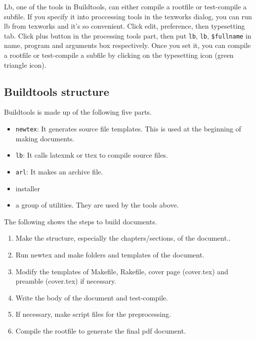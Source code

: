 Lb, one of the tools in Buildtools, can either compile a rootfile or
test-compile a subfile. If you specify it into proccessing tools in the
texworks dialog, you can run lb from texworks and it's so convenient.
Click edit, preference, then typesetting tab. Click plus button in the
processing tools part, then put \texttt{lb}, \texttt{lb},
\texttt{\$fullname} in name, program and arguments box respectively.
Once you set it, you can compile a rootfile or test-compile a subfile by
clicking on the typesetting icon (green triangle icon).

\hypertarget{buildtools-structure}{%
\subsection{Buildtools structure}\label{buildtools-structure}}

Buildtools is made up of the following five parts.

\begin{itemize}
\tightlist
\item
  \texttt{newtex}: It generates source file templates. This is used at
  the beginning of making documents.
\item
  \texttt{lb}: It calls latexmk or ttex to compile source files.
\item
  \texttt{arl}: It makes an archive file.
\item
  installer
\item
  a group of utilities. They are used by the tools above.
\end{itemize}

The following shows the steps to build documents.

\begin{enumerate}
\def\labelenumi{\arabic{enumi}.}
\tightlist
\item
  Make the structure, especially the chapters/sections, of the
  document..
\item
  Run newtex and make folders and templates of the document.
\item
  Modify the templates of Makefile, Rakefile, cover page (cover.tex) and
  preamble (cover.tex) if necessary.
\item
  Write the body of the document and test-compile.
\item
  If necessary, make script files for the preprocessing.
\item
  Compile the rootfile to generate the final pdf document.
\end{enumerate}

